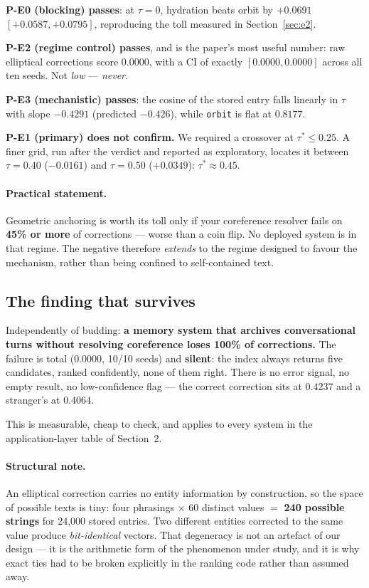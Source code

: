 \documentclass[11pt,a4paper]{article}
\begin{document}
\textbf{P-E0 (blocking) passes}: at $\tau=0$, hydration beats orbit by $+0.0691$
$[+0.0587, +0.0795]$, reproducing the toll measured in Section~\ref{sec:e2}.

\textbf{P-E2 (regime control) passes}, and is the paper's most useful number: raw elliptical
corrections score $\mathbf{0.0000}$, with a CI of exactly $[0.0000, 0.0000]$ across all ten seeds.
Not \emph{low} --- \emph{never}.

\textbf{P-E3 (mechanistic) passes}: the cosine of the stored entry falls linearly in $\tau$ with
slope $-0.4291$ (predicted $-0.426$), while \texttt{orbit} is flat at $0.8177$.

\textbf{P-E1 (primary) does not confirm.} We required a crossover at $\tau^{*} \leq 0.25$. A finer
grid, run after the verdict and reported as exploratory, locates it between $\tau = 0.40$
($-0.0161$) and $\tau = 0.50$ ($+0.0349$): $\tau^{*} \approx \mathbf{0.45}$.

\paragraph{Practical statement.} Geometric anchoring is worth its toll only if your coreference
resolver fails on \textbf{45\% or more} of corrections --- worse than a coin flip. No deployed system
is in that regime. The negative therefore \emph{extends} to the regime designed to favour the
mechanism, rather than being confined to self-contained text.

\subsection{The finding that survives}

Independently of budding: \textbf{a memory system that archives conversational turns without
resolving coreference loses 100\% of corrections.} The failure is total ($0.0000$, 10/10 seeds) and
\textbf{silent}: the index always returns five candidates, ranked confidently, none of them right.
There is no error signal, no empty result, no low-confidence flag --- the correct correction sits at
$0.4237$ and a stranger's at $0.4064$.

This is measurable, cheap to check, and applies to every system in the application-layer table of
Section~2.

\paragraph{Structural note.} An elliptical correction carries no entity information by construction,
so the space of possible texts is tiny: four phrasings $\times$ 60 distinct values $=$ \textbf{240
possible strings} for 24{,}000 stored entries. Two different entities corrected to the same value
produce \emph{bit-identical} vectors. That degeneracy is not an artefact of our design --- it is the
arithmetic form of the phenomenon under study, and it is why exact ties had to be broken explicitly
in the ranking code rather than assumed away.
\end{document}
